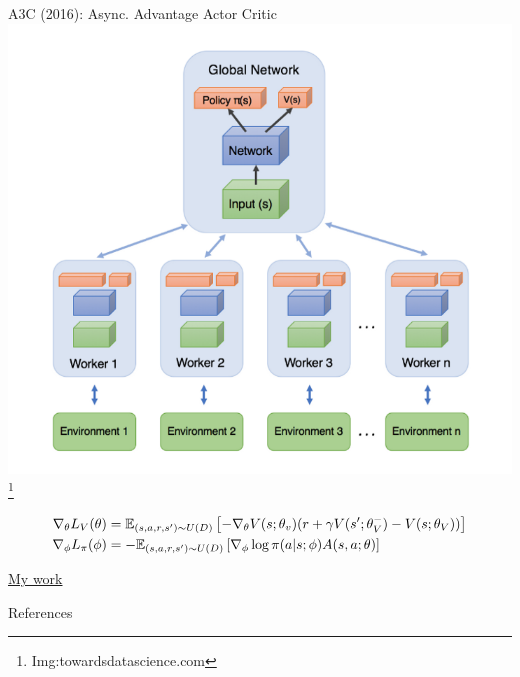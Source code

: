 \documentclass[notes]{beamer} %
\newcommand{\grad}{\nabla}
\begin{document}
\begin{frame}{A3C (2016): Async. Advantage Actor Critic}
    \includegraphics[width=0.5\linewidth]{./media/A3C.png}\footnote{Img:towardsdatascience.com}

    {\tiny
    \begin{align*}
      \grad_\theta L_V(\theta) &= \bbE_{(s,a,r,s') \sim U(D)} \left[
                                 -\grad_\theta V(s;\theta_v) (r +  \gamma V(s'; \theta_V^-)  - V(s; \theta_V)) \right]
      \\
      \grad_\phi L_\pi(\phi) &= - \bbE_{(s,a,r,s') \sim U(D)} \left[\grad_\phi \log\pi(a|s;\phi)A(s, a;\theta) \right]
    \end{align*}
    }
\end{frame}


\begin{frame}
  \href{https://vikasdhiman.info/safe-autonomous-nav-talk-sep2022/\#/other-work-video}{My work}
\end{frame}

\begin{frame}{References}
  \footnotesize
    
    
\end{frame}
\end{document}
